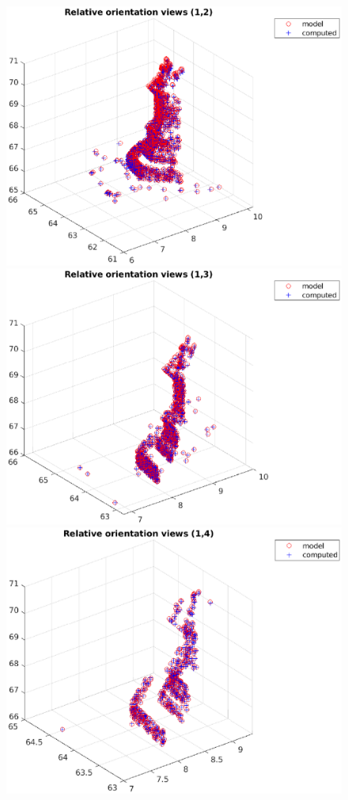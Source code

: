\documentclass[11pt]{article}
\begin{document}
\begin{figure}[H]
    \centering
    \includegraphics[scale=0.45]{images/relative_1.eps}
    \includegraphics[scale=0.45]{images/relative_2.eps}
    \qquad 
    \qquad
    \includegraphics[scale=0.45]{images/relative_3.eps}

\end{figure}
\end{document}
